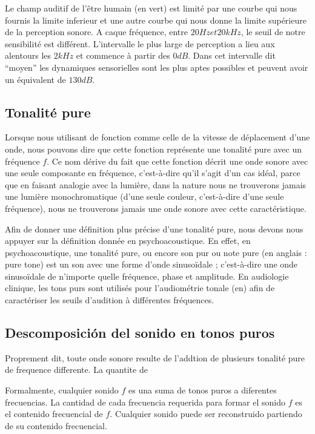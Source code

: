 \documentclass[conference,onecolumn]{IEEEtran}
\begin{document}

 Le champ auditif de l’être humain (en vert) est limité par une courbe qui nous fournis la limite inferieur et une autre courbe qui nous donne la limite supérieure de la perception sonore. A caque fréquence, entre $20 Hz et 20 kHz$, le seuil de notre sensibilité est différent. L’intervalle le plus large de perception a lieu aux alentours les $2 kHz$ et commence à partir des $0 dB$. Dans cet intervalle dit “moyen” les dynamiques sensorielles sont les plus aptes possibles et peuvent avoir un équivalent de $130 dB$.
 
 
 \subsection{Tonalité pure}
 Lorsque nous utilisant de fonction comme celle de la vitesse de déplacement d’une onde, nous pouvons dire que cette fonction représente une tonalité pure avec un fréquence $f$. Ce nom dérive du fait que cette fonction décrit une onde sonore avec une seule composante en fréquence, c’est-à-dire qu’il s’agit d’un cas idéal, parce que en faisant analogie avec la lumière, dans la nature nous ne trouverons jamais une lumière monochromatique (d’une seule couleur, c’est-à-dire d’une seule fréquence), nous ne trouverons jamais une onde sonore avec cette caractéristique.  

Afin de donner une définition plus précise d’une tonalité pure, nous devons nous appuyer sur la définition donnée en psychoacoustique. En effet, en psychoacoustique, une tonalité pure, ou encore son pur ou note pure (en anglais : pure tone) est un son avec une forme d'onde sinusoïdale ; c'est-à-dire une onde sinusoïdale de n'importe quelle fréquence, phase et amplitude. En audiologie clinique, les tons purs sont utilisés pour l'audiométrie tonale (en) afin de caractériser les seuils d'audition à différentes fréquences. 

\subsection{Descomposición del sonido en tonos puros}
Proprement dit, toute onde sonore resulte de l’addtion de plusieurs tonalité pure de frequence differente. La quantite de 

Formalmente, cualquier sonido $f$ es una suma de tonos puros a diferentes frecuencias. La cantidad de cada frecuencia requerida para formar el sonido $f$ es el contenido frecuencial de $f$. Cualquier sonido puede ser reconstruido partiendo de su contenido frecuencial.
\end{document}
